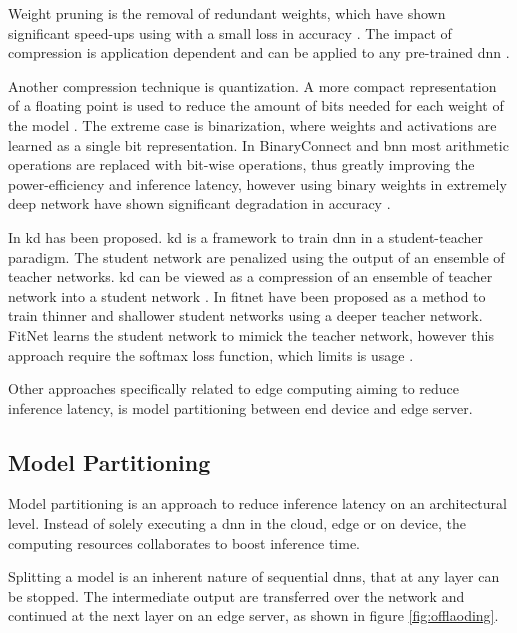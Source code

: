 Weight pruning is the removal of redundant weights, which have shown significant speed-ups using with a small loss in accuracy \cite{zhou_edge_2019}. The impact of compression is application dependent and can be applied to any pre-trained \gls{dnn} \cite{cheng_survey_2017}.

Another compression technique is quantization. A more compact representation of a floating point is used to reduce the amount of bits needed for each weight of the model \cite{cheng_survey_2017}. The extreme case is binarization, where weights and activations are learned as a single bit representation. In BinaryConnect \cite{courbariaux_binaryconnect:_2015} and \gls{bnn} \cite{courbariaux_binarized_2016} most arithmetic operations are replaced with bit-wise operations, thus greatly improving the power-efficiency and inference latency, however using binary weights in extremely deep network have shown significant degradation in accuracy \cite{cheng_survey_2017}.

In \cite{hinton_distilling_2015} \gls{kd} has been proposed. \gls{kd} is a framework to train \gls{dnn} in a student-teacher paradigm. The student network are penalized using the output of an ensemble of teacher networks. \gls{kd} can be viewed as a compression of an ensemble of teacher network into a student network \cite{cheng_survey_2017}. 
In \cite{romero_fitnets:_2014} \gls{fitnet} have been proposed as a method to train thinner and shallower student networks using a deeper teacher network. FitNet learns the student network to mimick the teacher network, however this approach require the softmax loss function, which limits is usage \cite{cheng_survey_2017}.  

Other approaches specifically related to edge computing aiming to reduce inference latency, is model partitioning between end device and edge server. 

\subsection{Model Partitioning}

Model partitioning is an approach to reduce inference latency on an architectural level. Instead of solely executing a \gls{dnn} in the cloud, edge or on device, the computing resources collaborates to boost inference time. 

Splitting a model is an inherent nature of sequential \gls{dnn}s, that at any layer can be stopped. The intermediate output are transferred over the network and continued at the next layer on an edge server, as shown in figure \ref{fig:offlaoding}.

